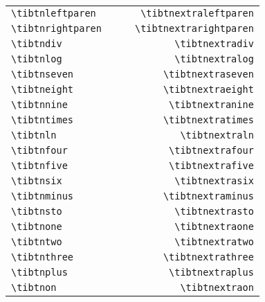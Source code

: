 \documentclass[a4paper,12pt]{article}
\begin{document}
\begin{center}
\begin{longtable}{lrlr}
		\verb|\tibtnleftparen|  & \tibtnleftparen  & \tibtnextraleftparen  & \verb|\tibtnextraleftparen|  \\
		\verb|\tibtnrightparen| & \tibtnrightparen & \tibtnextrarightparen & \verb|\tibtnextrarightparen| \\
		\verb|\tibtndiv|        & \tibtndiv        & \tibtnextradiv        & \verb|\tibtnextradiv|        \\
		\verb|\tibtnlog|        & \tibtnlog        & \tibtnextralog        & \verb|\tibtnextralog|        \\
		\verb|\tibtnseven|      & \tibtnseven      & \tibtnextraseven      & \verb|\tibtnextraseven|      \\
		\verb|\tibtneight|      & \tibtneight      & \tibtnextraeight      & \verb|\tibtnextraeight|      \\
		\verb|\tibtnnine|       & \tibtnnine       & \tibtnextranine       & \verb|\tibtnextranine|       \\
		\verb|\tibtntimes|      & \tibtntimes      & \tibtnextratimes      & \verb|\tibtnextratimes|      \\
		\verb|\tibtnln|         & \tibtnln         & \tibtnextraln         & \verb|\tibtnextraln|         \\
		\verb|\tibtnfour|       & \tibtnfour       & \tibtnextrafour       & \verb|\tibtnextrafour|       \\
		\verb|\tibtnfive|       & \tibtnfive       & \tibtnextrafive       & \verb|\tibtnextrafive|       \\
		\verb|\tibtnsix|        & \tibtnsix        & \tibtnextrasix        & \verb|\tibtnextrasix|        \\
		\verb|\tibtnminus|      & \tibtnminus      & \tibtnextraminus      & \verb|\tibtnextraminus|      \\
		\verb|\tibtnsto|        & \tibtnsto        & \tibtnextrasto        & \verb|\tibtnextrasto|        \\
		\verb|\tibtnone|        & \tibtnone        & \tibtnextraone        & \verb|\tibtnextraone|        \\
		\verb|\tibtntwo|        & \tibtntwo        & \tibtnextratwo        & \verb|\tibtnextratwo|        \\
		\verb|\tibtnthree|      & \tibtnthree      & \tibtnextrathree      & \verb|\tibtnextrathree|      \\
		\verb|\tibtnplus|       & \tibtnplus       & \tibtnextraplus       & \verb|\tibtnextraplus|       \\
		\verb|\tibtnon|         & \tibtnon         & \tibtnextraon         & \verb|\tibtnextraon|         \\

\end{longtable}
\end{center}
\end{document}

